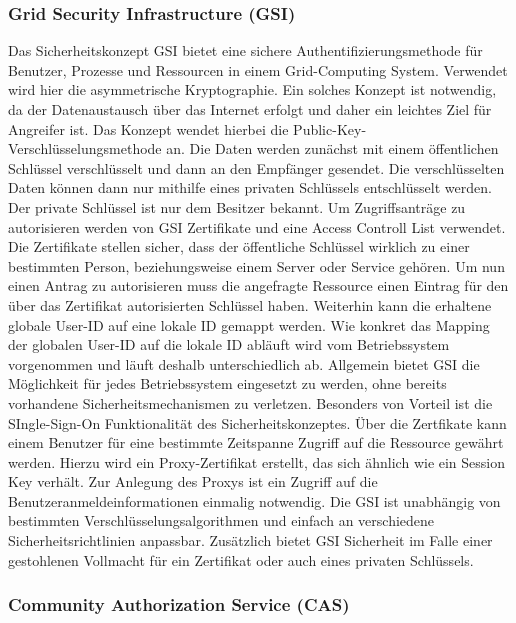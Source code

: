 \documentclass[utf8,biblatex]{lni}
\begin{document}
\subsubsection{Grid Security Infrastructure (GSI)}
 Das Sicherheitskonzept GSI bietet eine sichere Authentifizierungsmethode für Benutzer, Prozesse und Ressourcen in einem Grid-Computing System. Verwendet wird hier die asymmetrische Kryptographie.
 Ein solches Konzept ist notwendig, da der Datenaustausch über das Internet erfolgt und daher ein leichtes Ziel für Angreifer ist. Das Konzept wendet hierbei die 
 Public-Key-Verschlüsselungsmethode an. Die Daten werden zunächst mit einem öffentlichen Schlüssel verschlüsselt und dann an den Empfänger gesendet. Die verschlüsselten Daten können dann nur mithilfe
 eines privaten Schlüssels entschlüsselt werden. Der private Schlüssel ist nur dem Besitzer bekannt. Um Zugriffsanträge zu autorisieren werden von GSI Zertifikate und 
 eine Access Controll List verwendet. Die Zertifikate stellen sicher, dass der öffentliche Schlüssel wirklich zu einer bestimmten Person, beziehungsweise einem Server oder Service gehören. 
 Um nun einen Antrag zu autorisieren muss die angefragte Ressource einen Eintrag für den über das Zertifikat autorisierten Schlüssel haben. Weiterhin kann die erhaltene globale User-ID auf 
 eine lokale ID gemappt werden. Wie konkret das Mapping der globalen User-ID auf die lokale ID abläuft wird vom Betriebssystem vorgenommen und läuft deshalb unterschiedlich ab.
 Allgemein bietet GSI die Möglichkeit für jedes Betriebssystem eingesetzt zu werden, ohne bereits vorhandene Sicherheitsmechanismen zu verletzen. Besonders von Vorteil ist die 
 SIngle-Sign-On Funktionalität des Sicherheitskonzeptes. Über die Zertfikate kann einem Benutzer für eine bestimmte Zeitspanne Zugriff auf die Ressource gewährt werden. Hierzu wird ein Proxy-Zertifikat erstellt, das
 sich ähnlich wie ein Session Key verhält. Zur Anlegung des Proxys ist ein Zugriff auf die Benutzeranmeldeinformationen einmalig notwendig. Die GSI ist unabhängig von bestimmten Verschlüsselungsalgorithmen
 und einfach an verschiedene Sicherheitsrichtlinien anpassbar. Zusätzlich bietet GSI Sicherheit im Falle einer gestohlenen Vollmacht für ein Zertifikat oder auch eines privaten Schlüssels.
 \cite{Muraru.o.J}\cite{Epting.2002}

\subsubsection{Community Authorization Service (CAS)}
\end{document}
